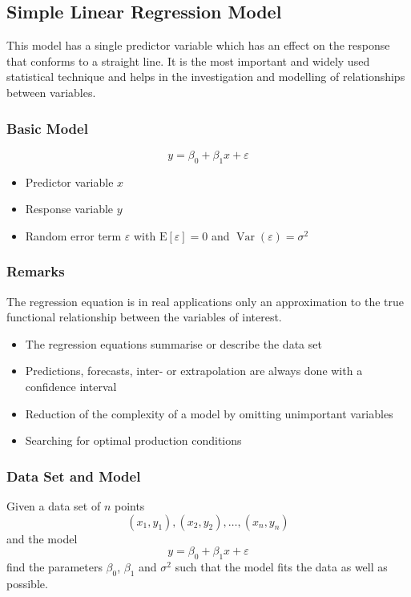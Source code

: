 \documentclass[11pt]{article}
\theoremstyle{definition}
\newcommand*\ev[1]{\mathrel{\text{E}\left[#1\right]}}
\newcommand*\Var[1]{\mathop{\text{Var}}\left(#1\right)}
\begin{document}
\subsection{Simple Linear Regression Model}
This model has a single predictor variable which has an effect on the response that conforms to a straight line. It is the most important and widely used statistical technique and helps in the investigation and modelling of relationships between variables.

\subsubsection{Basic Model}
\begin{equation*}
	y = \beta_0 + \beta_1 x + \varepsilon
\end{equation*}
\begin{itemize}
	\item Predictor variable $x$
	\item Response variable $y$
	\item Random error term $\varepsilon$ with $\ev{\varepsilon} = 0$ and $\Var{\varepsilon} = \sigma^2$
\end{itemize}


\subsubsection{Remarks}
The regression equation is in real applications only an approximation to the true functional relationship between the variables of interest.
\begin{itemize}
	\item The regression equations summarise or describe the data set
	\item Predictions, forecasts, inter- or extrapolation are always done with a confidence interval
	\item Reduction of the complexity of a model by omitting unimportant variables
	\item Searching for optimal production conditions
\end{itemize}

\subsubsection{Data Set and Model}
Given a data set of $n$ points
\begin{equation*}
	(x_1,y_1), (x_2,y_2), \dots, (x_n,y_n)
\end{equation*}
and the model
\begin{equation*}
	y = \beta_0 + \beta_1 x + \varepsilon
\end{equation*}
find the parameters $\beta_0$, $\beta_1$ and $\sigma^2$ such that the model fits the data as well as possible.
\end{document}
